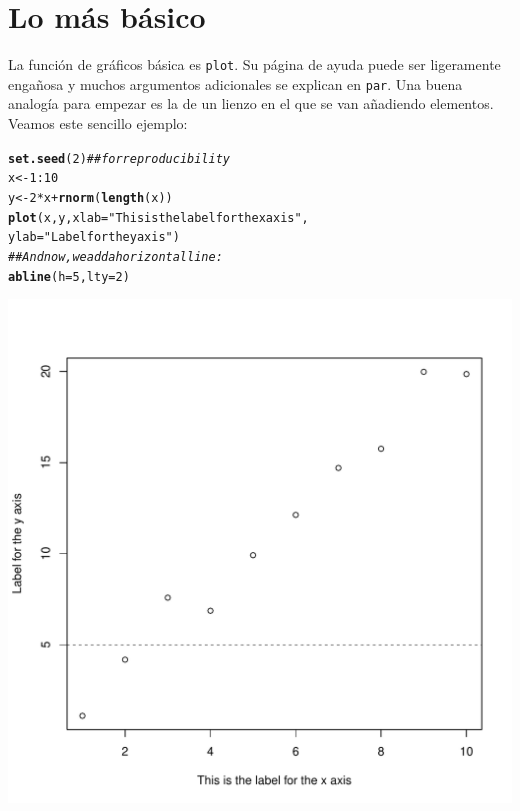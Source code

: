 \documentclass{config/apuntes}\usepackage[]{graphicx}\usepackage[]{xcolor}
\makeatletter
\def\maxwidth{ %
  \ifdim\Gin@nat@width>\linewidth
    \linewidth
  \else
    \Gin@nat@width
  \fi
}
\newcommand{\hlnum}[1]{\textcolor[rgb]{0.686,0.059,0.569}{#1}}%
\newcommand{\hlsng}[1]{\textcolor[rgb]{0.192,0.494,0.8}{#1}}%
\newcommand{\hlcom}[1]{\textcolor[rgb]{0.678,0.584,0.686}{\textit{#1}}}%
\newcommand{\hlopt}[1]{\textcolor[rgb]{0,0,0}{#1}}%
\newcommand{\hldef}[1]{\textcolor[rgb]{0.345,0.345,0.345}{#1}}%
\newcommand{\hlkwb}[1]{\textcolor[rgb]{0.69,0.353,0.396}{#1}}%
\newcommand{\hlkwc}[1]{\textcolor[rgb]{0.333,0.667,0.333}{#1}}%
\newcommand{\hlkwd}[1]{\textcolor[rgb]{0.737,0.353,0.396}{\textbf{#1}}}%
\newenvironment{kframe}{%
 \def\at@end@of@kframe{}%
 \ifinner\ifhmode%
  \def\at@end@of@kframe{\end{minipage}}%
  \begin{minipage}{\columnwidth}%
 \fi\fi%
 \def\FrameCommand##1{\hskip\@totalleftmargin \hskip-\fboxsep
 \colorbox{shadecolor}{##1}\hskip-\fboxsep
     \hskip-\linewidth \hskip-\@totalleftmargin \hskip\columnwidth}%
 \MakeFramed {\advance\hsize-\width
   \@totalleftmargin\z@ \linewidth\hsize
   \@setminipage}}%
 {\par\unskip\endMakeFramed%
 \at@end@of@kframe}
\newenvironment{knitrout}{}{} %
\newcommand{\code}[1]{\texttt{#1}}
\makeatother
\begin{document}
\section{Lo más básico}
La función de gráficos básica es \code{plot}. Su página de ayuda puede ser ligeramente engañosa y muchos argumentos adicionales se explican en \code{par}. Una buena analogía para empezar es la de un lienzo en el que se van añadiendo elementos. Veamos este sencillo ejemplo:
\begin{knitrout}
\color{fgcolor}\begin{kframe}
\begin{alltt}
\hlkwd{set.seed}\hldef{(}\hlnum{2}\hldef{)} \hlcom{## for reproducibility}
\hldef{x} \hlkwb{<-} \hlnum{1}\hlopt{:}\hlnum{10}
\hldef{y} \hlkwb{<-} \hlnum{2} \hlopt{*} \hldef{x} \hlopt{+} \hlkwd{rnorm}\hldef{(}\hlkwd{length}\hldef{(x))}
\hlkwd{plot}\hldef{(x, y,} \hlkwc{xlab} \hldef{=} \hlsng{"This is the label for the x axis"}\hldef{,}
     \hlkwc{ylab} \hldef{=} \hlsng{"Label for the y axis"}\hldef{)}
\hlcom{## And now, we add a horizontal line:}
\hlkwd{abline}\hldef{(}\hlkwc{h} \hldef{=} \hlnum{5}\hldef{,} \hlkwc{lty} \hldef{=} \hlnum{2}\hldef{)}
\end{alltt}
\end{kframe}
\includegraphics[width=\maxwidth]{figure/unnamed-chunk-72-1} 
\end{knitrout}
\end{document}
